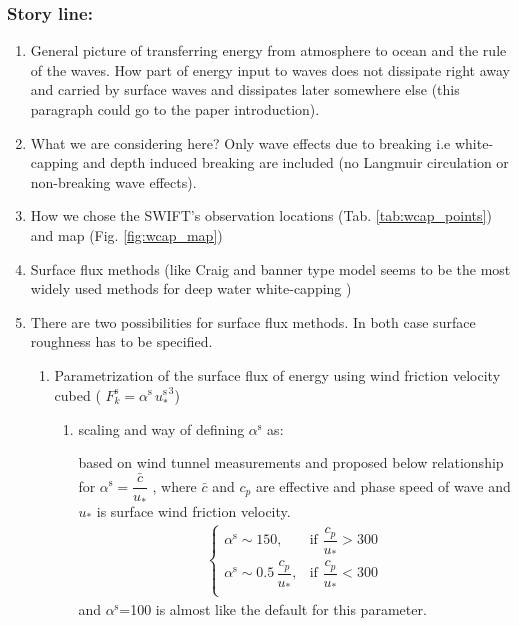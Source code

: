 \documentclass[final]{svjour3}
\begin{document}
\subsubsection{Story line:}
\begin{enumerate}
  \item General picture of transferring energy from atmosphere to ocean and the
  rule of the waves. How part of energy input to waves does not dissipate right
  away and carried by surface waves and dissipates later somewhere else (this
  paragraph  could go to the paper introduction).
  \item What we are considering here? Only wave effects due to breaking i.e
  white-capping and depth induced breaking are included (no Langmuir circulation
  or non-breaking wave effects).
  \item How we chose the SWIFT's observation locations (Tab.
  \ref{tab:wcap_points}) and map (Fig. \ref{fig:wcap_map})
  \item Surface flux methods (like Craig and banner type model seems to be the
  most widely used methods for deep water white-capping )
  \item There are two possibilities for surface flux methods. In both case
  surface roughness has to be specified.
  \begin{enumerate}
    \item Parametrization of the surface flux of energy using wind friction
    velocity cubed ( $F_k^\mathrm{s}=\alpha^\mathrm{s} \, {u_*^\mathrm{s}}^3$)
      \begin{enumerate}
          \item \cite{Terrayetal96} scaling and \cite{craig1996velocity} way of
          defining $\alpha^\mathrm{s}$ as:
          
          \cite{craig1996velocity} based on wind tunnel measurements and
          \cite{Terrayetal96} proposed below relationship for
          $\alpha^\mathrm{s}=\dfrac{\bar{c}}{u_*}$ , where $\bar{c}$ and $c_p$
          are effective and phase speed of wave and $u_*$ is surface wind
          friction velocity.
          \begin{align}
            \begin{cases}
            \alpha^\mathrm{s} \sim 150 , & \text{if } \dfrac{c_p}{u_*} > 300 \\
            \alpha^\mathrm{s} \sim 0.5\, \dfrac{c_p}{u_*} , & \text{if } \dfrac{c_p}{u_*} < 300 \\
            \end{cases}
          \end{align}
          and $\alpha^\mathrm{s}$=100 is almost like the default for this
          parameter.
          

\end{enumerate}
\end{enumerate}
\end{enumerate}
\end{document}
